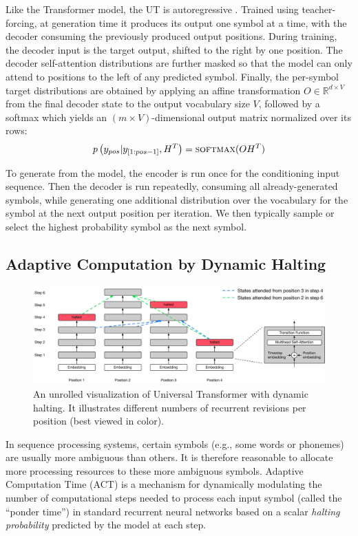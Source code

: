 Like the Transformer model, the UT is autoregressive \citep{graves2013generating}. Trained using teacher-forcing, at generation time it produces its output one symbol at a time, with the decoder consuming the previously produced output positions. During training, the decoder input is the target output, shifted to the right by one position.
The decoder self-attention distributions are further masked so that the model can only attend to positions to the left of any predicted symbol. Finally, the per-symbol target distributions are obtained by applying an affine transformation $O \in \mathbb{R}^{d \times V}$ from the final decoder state to the output vocabulary size $V$, followed by a softmax which yields an $(m \times V)$-dimensional output matrix normalized over its rows:
\begin{equation}
 p\left(y_{pos} | y_{[1:pos - 1]}, H^T\right) = \textsc{softmax}(OH^T)
\end{equation}

To generate from the model, the encoder is run once for the conditioning input sequence. Then the decoder is run repeatedly, consuming all already-generated symbols, while generating one additional distribution over the vocabulary for the symbol at the next output position per iteration. We then typically sample or select the highest probability symbol as the next symbol.


\subsection{Adaptive Computation by Dynamic Halting}
\label{sec:dynamic-halting}
\begin{figure}
 \centering
 \includegraphics[width=1.0\textwidth]{04-part-03/chapter-06/figs_and_tables/fig_adaptive-universal-transformer.pdf}
 \caption{An unrolled visualization of Universal Transformer with dynamic halting. It illustrates different numbers of recurrent revisions per position (best viewed in color).}
 \label{fig:adaptive_ut}
\end{figure}
In sequence processing systems, certain symbols (e.g., some words or phonemes) are usually more ambiguous than others. It is therefore reasonable to allocate more processing resources to these more ambiguous symbols. Adaptive Computation Time (ACT) \citep{graves2016adaptive} is a mechanism for dynamically modulating the number of computational steps needed to process each input symbol (called the ``ponder time'') in standard recurrent neural networks based on a scalar \emph{halting probability} predicted by the model at each step.

